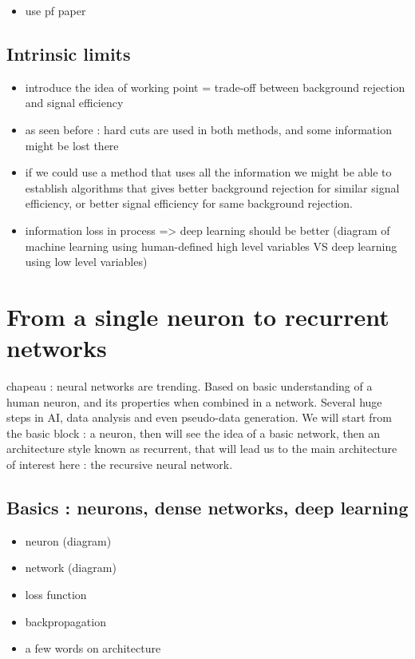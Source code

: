 \begin{itemize}
    \item use pf paper
\end{itemize}

\subsection{Intrinsic limits}

\begin{itemize}
    \item introduce the idea of working point = trade-off between background rejection and signal efficiency
    \item as seen before : hard cuts are used in both methods, and some information might be lost there
    \item if we could use a method that uses all the information we might be able to establish algorithms that gives better background rejection for similar signal efficiency, or better signal efficiency for same background rejection.
    \item information loss in process => deep learning should be better (diagram of machine learning using human-defined high level variables VS deep learning using low level variables)

\end{itemize}


\section{From a single neuron to recurrent networks}
chapeau : neural networks are trending. Based on basic understanding of a human neuron, and its properties when combined in a network. Several huge steps in AI, data analysis and even pseudo-data generation. We will start from the basic block : a neuron, then will see the idea of a basic network, then an architecture style known as recurrent, that will lead us to the main architecture of interest here : the recursive neural network.

\subsection{Basics : neurons, dense networks, deep learning}

\begin{itemize}
    \item neuron (diagram)
    \item network (diagram)
    \item loss function
    \item backpropagation
    \item a few words on architecture
\end{itemize}

